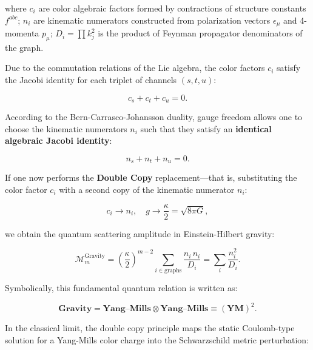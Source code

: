 \documentclass[11pt,a4paper]{article}
\theoremstyle{definition}
\begin{document}
where $c_i$ are color algebraic factors formed by contractions of structure constants $f^{abc}$;  
$n_i$ are kinematic numerators constructed from polarization vectors $\epsilon_\mu$ and 4-momenta $p_\mu$;  
$D_i = \prod k_j^2$ is the product of Feynman propagator denominators of the graph.

Due to the commutation relations of the Lie algebra, the color factors $c_i$ satisfy the Jacobi identity for each triplet of channels $(s, t, u)$:

\begin{equation}\label{eq:2.3.54}\tag{2.3.54}
c_s + c_t + c_u = 0.
\end{equation}

According to the Bern-Carrasco-Johansson duality, gauge freedom allows one to choose the kinematic numerators $n_i$ such that they satisfy an \textbf{identical algebraic Jacobi identity}:

\begin{equation}\label{eq:2.3.55}\tag{2.3.55}
n_s + n_t + n_u = 0.
\end{equation}

If one now performs the \textbf{Double Copy} replacement---that is, substituting the color factor $c_i$ with a second copy of the kinematic numerator $n_i$:

\begin{equation}\label{eq:2.3.56}\tag{2.3.56}
c_i \longrightarrow n_i, \quad g \longrightarrow \frac{\kappa}{2} = \sqrt{8\pi G},
\end{equation}

we obtain the quantum scattering amplitude in Einstein-Hilbert gravity:

\begin{equation}\label{eq:2.3.57}\tag{2.3.57}
\mathcal{M}_{m}^{\text{Gravity}} = \left( \frac{\kappa}{2} \right)^{m-2} \sum_{i \in \text{graphs}} \frac{n_i \, n_i}{D_i} = \sum_{i} \frac{n_i^2}{D_i}.
\end{equation}

Symbolically, this fundamental quantum relation is written as:

\begin{equation}\label{eq:2.3.58}\tag{2.3.58}
\mathbf{\text{Gravity}} = \mathbf{\text{Yang--Mills}} \otimes \mathbf{\text{Yang--Mills}} \equiv (\mathbf{\text{YM}})^2.
\end{equation}

In the classical limit, the double copy principle maps the static Coulomb-type solution for a Yang-Mills color charge into the Schwarzschild metric perturbation:
\end{document}
